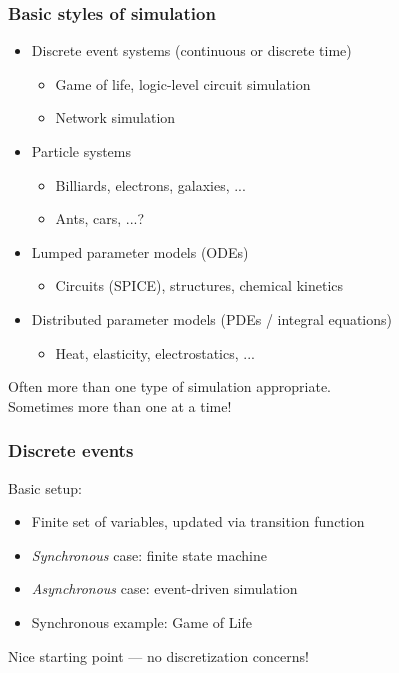 \documentclass{beamer}
\begin{document}
\begin{frame}
  \frametitle{Basic styles of simulation}

  \begin{itemize}
  \item Discrete event systems (continuous or discrete time)
    \begin{itemize}
    \item Game of life, logic-level circuit simulation
    \item Network simulation
    \end{itemize}
  \item Particle systems
    \begin{itemize}
    \item Billiards, electrons, galaxies, ...
    \item Ants, cars, ...?
    \end{itemize}
  \item Lumped parameter models (ODEs)
    \begin{itemize}
    \item Circuits (SPICE), structures, chemical kinetics
    \end{itemize}
  \item Distributed parameter models (PDEs / integral equations)
    \begin{itemize}
    \item Heat, elasticity, electrostatics, ...
    \end{itemize}
  \end{itemize}
  Often more than one type of simulation appropriate. \\
  Sometimes more than one at a time!

\end{frame}


\begin{frame}
  \frametitle{Discrete events}

  Basic setup:
  \begin{itemize}
  \item Finite set of variables, updated via transition function
  \item {\em Synchronous} case: finite state machine
  \item {\em Asynchronous} case: event-driven simulation
  \item Synchronous example: Game of Life
  \end{itemize}

  \vspace{5mm}
  Nice starting point --- no discretization concerns!
\end{frame}
\end{document}
